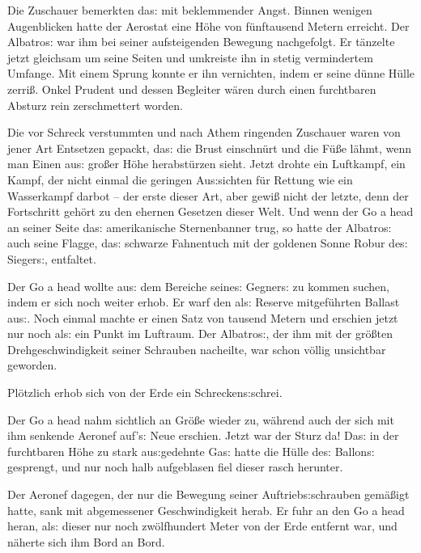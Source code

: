 \documentclass[oneside,12pt]{book}
\newenvironment{antiqua}{\normalfont}{}
\newcommand{\s}{s:}
\begin{document}
Die Zuschauer bemerkten da{\s} mit beklemmender Angst. Binnen wenigen
Augenblicken hatte der Aerostat eine H\"ohe von f\"unftausend Metern
erreicht. Der {\glqq}Albatro{\s}{\grqq} war ihm bei seiner
aufsteigenden Bewegung nachgefolgt. Er t\"anzelte jetzt gleichsam um
seine Seiten und umkreiste ihn in stetig vermindertem Umfange. Mit
einem Sprung konnte er ihn vernichten, indem er seine d\"unne H\"ulle
zerri{\ss}. Onkel Prudent und dessen Begleiter w\"aren durch einen
furchtbaren Absturz rein zerschmettert worden.

Die vor Schreck verstummten und nach Athem ringenden Zuschauer waren
von jener Art Entsetzen gepackt, da{\s} die Brust einschn\"urt und
die F\"u{\ss}e l\"ahmt, wenn man Einen au{\s} gro{\ss}er H\"ohe
herabst\"urzen sieht. Jetzt drohte ein Luftkampf, ein Kampf, der
nicht einmal die geringen Au{\s}sichten f\"ur Rettung wie ein
Wasserkampf darbot -- der erste dieser Art, aber gewi{\ss} nicht der
letzte, denn der Fortschritt geh\"ort zu den ehernen Gesetzen dieser
Welt. Und wenn der \begin{antiqua}Go a head\end{antiqua} an seiner
Seite da{\s} amerikanische Sternenbanner trug, so hatte der
{\glqq}Albatro{\s}{\grqq} auch seine Flagge, da{\s} schwarze
Fahnentuch mit der goldenen Sonne Robur de{\s} Sieger{\s}, entfaltet.

Der \begin{antiqua}Go a head\end{antiqua} wollte au{\s} dem Bereiche
seine{\s} Gegner{\s} zu kommen suchen, indem er sich noch weiter
erhob. Er warf den al{\s} Reserve mitgef\"uhrten Ballast au{\s}. Noch
einmal machte er einen Satz von tausend Metern und erschien jetzt nur
noch al{\s} ein Punkt im Luftraum. Der {\glqq}Albatro{\s}{\grqq}, der
ihm mit der gr\"o{\ss}ten Drehgeschwindigkeit seiner Schrauben
nacheilte, war schon v\"ollig unsichtbar geworden.

Pl\"otzlich erhob sich von der Erde ein Schrecken{\s}schrei.

Der \begin{antiqua}Go a head\end{antiqua} nahm sichtlich an
Gr\"o{\ss}e wieder zu, w\"ahrend auch der sich mit ihm senkende
Aeronef auf'{\s} Neue erschien. Jetzt war der Sturz da! Da{\s} in der
furchtbaren H\"ohe zu stark au{\s}gedehnte Ga{\s} hatte die H\"ulle
de{\s} Ballon{\s} gesprengt, und nur noch halb aufgeblasen fiel
dieser rasch herunter.

Der Aeronef dagegen, der nur die Bewegung seiner Auftrieb{\s}schrauben
gem\"a{\ss}igt hatte, sank mit abgemessener Geschwindigkeit herab. Er
fuhr an den \begin{antiqua}Go a head\end{antiqua} heran, al{\s}
dieser nur noch zw\"olfhundert Meter von der Erde entfernt war, und
n\"aherte sich ihm Bord an Bord.
\end{document}
